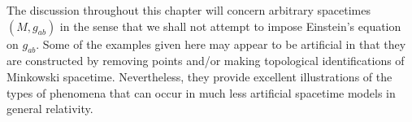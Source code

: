 The discussion throughout this chapter will concern arbitrary spacetimes \((M,g_{ab})\)
in the sense that we shall not attempt to impose Einstein's equation on \(g_{ab}\). Some of
the examples given here may appear to be artificial in that they are constructed by
removing points and/or making topological identifications of Minkowski spacetime.
Nevertheless, they provide excellent illustrations of the types of phenomena that can
occur in much less artificial spacetime models in general relativity.
